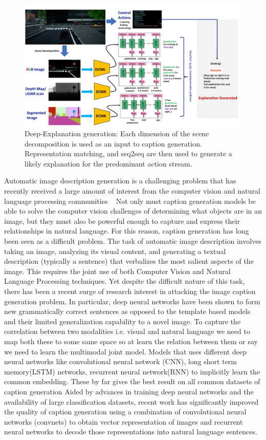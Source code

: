 
\begin{figure}
    \centering
    \includegraphics[width=\columnwidth]{figures/deep_exp.pdf}
    \caption{Deep-Explanation generation: Each dimension of the scene decomposition is used as an input to caption generation. Representation matching, and seq2seq are then used to generate a likely explanation for the predominant action stream.  }
    \label{fig:deep_exp}
\end{figure}

Automatic image description generation is a challenging problem that has recently received a large amount of interest from the computer vision and natural language processing communities ~\cite{johnson2016densecap, xu2015show, wang2016image, karpathy2015deep,Vinyals2015ShowAT}
Not only must caption generation models be able to solve the computer vision challenges of determining what objects are in an image, but they must also be powerful enough to capture and express their relationships in natural language. 
For this reason, caption generation has long been seen as a difficult problem.
The task of automatic image description involves taking an image, analyzing its visual content, and generating a textual description (typically a sentence) that verbalizes the most salient aspects of the image. 
This requires the joint use of both Computer Vision and Natural Language Processing techniques.
Yet despite the difficult nature of this task, there has been a recent surge of research interest in attacking the image caption generation problem. In particular, deep neural networks have been shown to form new grammatically correct sentences as opposed to the template based models and their limited generalization capability to a novel image.
To capture the correlation between two modalities i.e. visual and natural language we need to map both these to some same space so at learn the relation between them or say we need to learn the multimodal joint model.
Models that uses different deep neural networks like convolutional neural network (CNN), long short term memory(LSTM) networks, recurrent neural network(RNN) to implicitly learn the common embedding. These by far gives the best result on all common datasets of caption generation
Aided by advances in training deep neural networks and the availability of large classification datasets, recent work has significantly improved the quality of caption generation using a combination of convolutional neural networks (convnets) to obtain vector representation of images and recurrent neural networks to decode those representations into natural language sentences.

